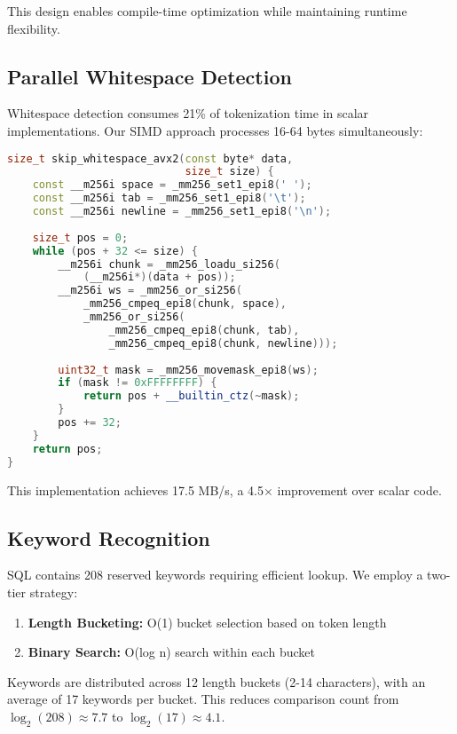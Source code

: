 \documentclass[conference]{IEEEtran}
\begin{document}
This design enables compile-time optimization while maintaining runtime flexibility.

\subsection{Parallel Whitespace Detection}

Whitespace detection consumes 21\% of tokenization time in scalar implementations. Our SIMD approach processes 16-64 bytes simultaneously:

\begin{lstlisting}[language=C++, basicstyle=\footnotesize]
size_t skip_whitespace_avx2(const byte* data, 
                            size_t size) {
    const __m256i space = _mm256_set1_epi8(' ');
    const __m256i tab = _mm256_set1_epi8('\t');
    const __m256i newline = _mm256_set1_epi8('\n');
    
    size_t pos = 0;
    while (pos + 32 <= size) {
        __m256i chunk = _mm256_loadu_si256(
            (__m256i*)(data + pos));
        __m256i ws = _mm256_or_si256(
            _mm256_cmpeq_epi8(chunk, space),
            _mm256_or_si256(
                _mm256_cmpeq_epi8(chunk, tab),
                _mm256_cmpeq_epi8(chunk, newline)));
        
        uint32_t mask = _mm256_movemask_epi8(ws);
        if (mask != 0xFFFFFFFF) {
            return pos + __builtin_ctz(~mask);
        }
        pos += 32;
    }
    return pos;
}
\end{lstlisting}

This implementation achieves 17.5 MB/s, a 4.5$\times$ improvement over scalar code.

\subsection{Keyword Recognition}

SQL contains 208 reserved keywords requiring efficient lookup. We employ a two-tier strategy:

\begin{enumerate}
\item \textbf{Length Bucketing:} O(1) bucket selection based on token length
\item \textbf{Binary Search:} O(log n) search within each bucket
\end{enumerate}

Keywords are distributed across 12 length buckets (2-14 characters), with an average of 17 keywords per bucket. This reduces comparison count from $\log_2(208) \approx 7.7$ to $\log_2(17) \approx 4.1$.
\end{document}
